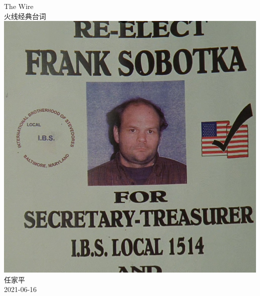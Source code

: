 \documentclass[a4paper, 12pt]{article}
\begin{document}
\begin{center}
    {\Huge 
        The Wire }\\[12pt]
    {\huge 
        火线经典台词}\\[20pt]
    
    \includegraphics[scale=0.5]{figure/cover.jpg} 
    \\[20pt] 

    {\Large 
        任家平\\[12pt]
        2021-06-16}
\end{center}
\thispagestyle{empty}



\newpage
{}
\tableofcontents
\newpage
{}



\end{document}
